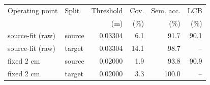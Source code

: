 \begin{tabular}{llrrrr}
\toprule
Operating point & Split & Threshold & Cov. & Sem. acc. & LCB \\
 & & (m) & (\%) & (\%) & (\%) \\
\midrule
source-fit (raw) & source & 0.03304 & 6.1 & 91.7 & 90.1 \\
source-fit (raw) & target & 0.03304 & 14.1 & 98.7 & -- \\
fixed 2 cm & source & 0.02000 & 1.9 & 93.8 & 90.9 \\
fixed 2 cm & target & 0.02000 & 3.3 & 100.0 & -- \\
\bottomrule
\end{tabular}
